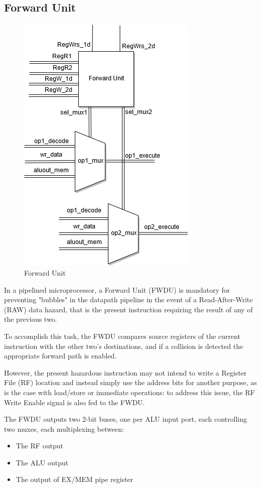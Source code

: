 \documentclass[10pt,  english, makeidx, a4paper, titlepage, oneside]{book}
\begin{document}
\subsection{Forward Unit}
\label{fwdu}
\begin{figure}
\paragraph{}
\vspace*{-\parskip}	\centering
	\includegraphics[width=.45\textwidth]{pics/ForwardUnit.png}
	\caption{Forward Unit}
	\label{fig:form}
\end{figure}
In a pipelined microprocessor, a Forward Unit (FWDU) is mandatory for preventing "bubbles" in the datapath pipeline in the event of a Read-After-Write (RAW) data hazard, that is the present instruction requiring the result of any of the previous two. 

To accomplish this task, the FWDU compares source registers of the current instruction with the other two's destinations, and if a collision is detected the appropriate forward path is enabled.

However, the present hazardous instruction may not intend to write a Register File (RF) location and instead simply use the address bits for another purpose, as is the case with load/store or immediate operations: to address this issue, the RF Write Enable signal is also fed to the FWDU.

The FWDU outputs two 2-bit buses, one per ALU input port, each controlling two muxes, each multiplexing between:

\begin{itemize}
    \item The RF output
    \item The ALU output
    \item The output of EX/MEM pipe register
\end{itemize}{}
\end{document}
